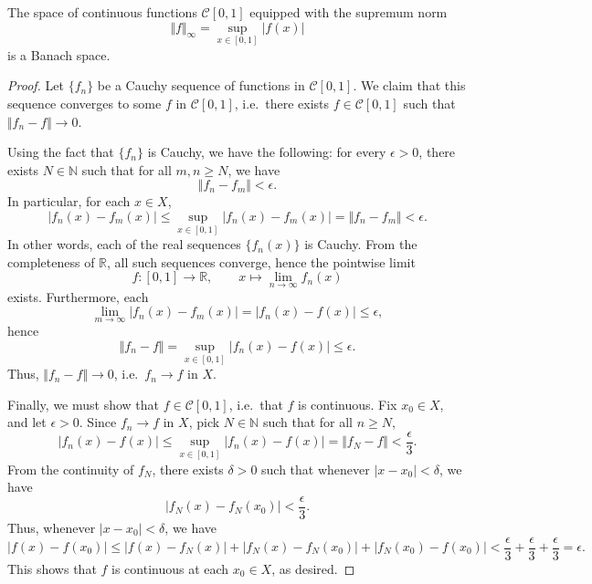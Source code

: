 \documentclass[11pt]{article}
\newcommand{\R}{\mathbb{R}}
\newcommand{\N}{\mathbb{N}}
\newcommand{\norm}[1]{\Vert #1 \Vert}
\theoremstyle{definition}
\theoremstyle{remark}
\begin{document}
    \begin{lemma}
        The space of continuous functions $\mathcal{C}[0, 1]$ equipped with the
        supremum norm \[
            \norm{f}_\infty = \sup_{x \in [0, 1]} |f(x)|
        \] is a Banach space.
    \end{lemma}
    \begin{proof}
        Let $\{f_n\}$ be a Cauchy sequence of functions in $\mathcal{C}[0, 1]$. We
        claim that this sequence converges to some $f$ in $\mathcal{C}[0, 1]$, i.e.\
        there exists $f \in \mathcal{C}[0, 1]$ such that $\norm{f_n - f} \to 0$.

        Using the fact that $\{f_n\}$ is Cauchy, we have the following: for every
        $\epsilon > 0$, there exists $N \in \N$ such that for all $m, n \geq N$, we
        have \[
            \norm{f_n - f_m} < \epsilon.
        \] In particular, for each $x \in X$, \[
            |f_n(x) - f_m(x)| \leq \sup_{x \in [0, 1]} |f_n(x) - f_m(x)| = \norm{f_n
            - f_m} < \epsilon.
        \] In other words, each of the real sequences $\{f_n(x)\}$ is Cauchy. From
        the completeness of $\R$, all such sequences converge, hence the pointwise
        limit \[
            f\colon [0, 1] \to \R, \qquad x \mapsto \lim_{n \to \infty} f_n(x)
        \] exists. Furthermore, each \[
            \lim_{m \to \infty} |f_n(x) - f_m(x)| = |f_n(x) - f(x)| \leq \epsilon,
        \] hence \[
            \norm{f_n - f} = \sup_{x \in [0, 1]} |f_n(x) - f(x)| \leq \epsilon.
        \] Thus, $\norm{f_n - f} \to 0$, i.e.\ $f_n \to f$ in $X$.

        Finally, we must show that $f \in \mathcal{C}[0, 1]$, i.e.\ that $f$ is
        continuous. Fix $x_0 \in X$, and let $\epsilon > 0$. Since $f_n \to f$ in
        $X$, pick $N \in \N$ such that for all $n \geq N$, \[
            |f_n(x) - f(x)| \leq \sup_{x \in [0, 1]} |f_n(x) - f(x)| = \norm{f_N - f}
            < \frac{\epsilon}{3}.
        \] From the continuity of $f_N$, there exists $\delta > 0$ such that whenever
        $|x - x_0| < \delta$, we have \[
            |f_N(x) - f_N(x_0)| < \frac{\epsilon}{3}.
        \] Thus, whenever $|x - x_0| < \delta$, we have \[
            |f(x) - f(x_0)| \leq |f(x) - f_N(x)| + |f_N(x) - f_N(x_0)| + |f_N(x_0) -
            f(x_0)| < \frac{\epsilon}{3} + \frac{\epsilon}{3} + \frac{\epsilon}{3} =
            \epsilon.
        \] This shows that $f$ is continuous at each $x_0 \in X$, as desired.
    \end{proof}
\end{document}
